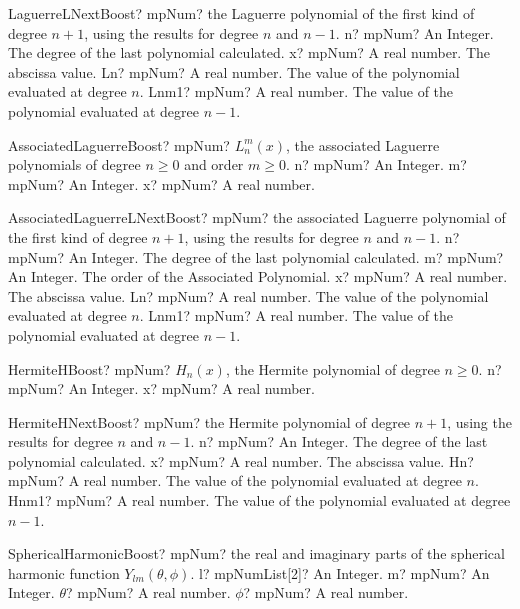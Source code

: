 \documentclass[12pt,a4paper,openany]{book}
\begin{document}
\begin{mpFunctionsExtract}
\mpFunctionFour
{LaguerreLNextBoost? mpNum? the Laguerre polynomial of the first kind of degree $n+1$, using the results for degree $n$ and $n-1$.}
{n? mpNum? An Integer. The degree of the last polynomial calculated.}
{x? mpNum? A real number. The abscissa value.}
{Ln? mpNum? A real number. The value of the polynomial evaluated at degree $n$.}
{Lnm1? mpNum? A real number. The value of the polynomial evaluated at degree $n-1$.}
\end{mpFunctionsExtract}

\begin{mpFunctionsExtract}
\mpFunctionThree
{AssociatedLaguerreBoost? mpNum? $L^m_n (x)$, the associated Laguerre polynomials of degree $n \geq 0$ and order $m \geq 0$.}
{n? mpNum? An Integer.}
{m? mpNum? An Integer.}
{x? mpNum? A real number.}
\end{mpFunctionsExtract}

\begin{mpFunctionsExtract}
\mpFunctionFive
{AssociatedLaguerreLNextBoost? mpNum? the associated Laguerre polynomial of the first kind of degree $n+1$, using the results for degree $n$ and $n-1$.}
{n? mpNum? An Integer. The degree of the last polynomial calculated.}
{m? mpNum? An Integer. The order of the Associated Polynomial.}
{x? mpNum? A real number. The abscissa value.}
{Ln? mpNum? A real number. The value of the polynomial evaluated at degree $n$.}
{Lnm1? mpNum? A real number. The value of the polynomial evaluated at degree $n-1$.}
\end{mpFunctionsExtract}

\begin{mpFunctionsExtract}
\mpFunctionTwo
{HermiteHBoost? mpNum? $H_n(x)$, the Hermite polynomial of degree $n \geq 0$.}
{n? mpNum? An Integer.}
{x? mpNum? A real number.}
\end{mpFunctionsExtract}

\begin{mpFunctionsExtract}
\mpFunctionFour
{HermiteHNextBoost? mpNum? the Hermite polynomial of degree $n+1$, using the results for degree $n$ and $n-1$.}
{n? mpNum? An Integer. The degree of the last polynomial calculated.}
{x? mpNum? A real number. The abscissa value.}
{Hn? mpNum? A real number. The value of the polynomial evaluated at degree $n$.}
{Hnm1? mpNum? A real number. The value of the polynomial evaluated at degree $n-1$.}
\end{mpFunctionsExtract}

\begin{mpFunctionsExtract}
\mpFunctionFour
{SphericalHarmonicBoost? mpNum? the real and imaginary parts of the spherical harmonic function $Y_{lm}(\theta, \phi)$.}
{l? mpNumList[2]? An Integer.}
{m? mpNum? An Integer.}
{$\theta$? mpNum? A real number.}
{$\phi$? mpNum? A real number.}
\end{mpFunctionsExtract}
\end{document}
